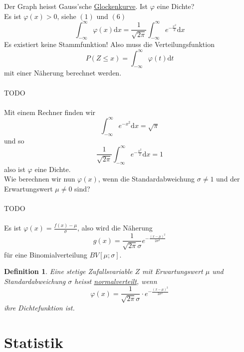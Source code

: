 \documentclass{report}
\newtheorem{mydef}{Definition}
\begin{document}
Der Graph heisst Gauss\rq{}sche \underline{Glockenkurve}. Ist $\varphi$ eine Dichte?\\
Es ist $\varphi(x) > 0$, siehe $(1)$ und $(6)$
\begin{equation}
\int_{- \infty}^{\infty} \varphi(x) \mathrm{d}x = \frac{1}{\sqrt{2 \pi}} \int_{- \infty}^{\infty} e^{-\frac{x^2}{2}} \mathrm{d}x
\end{equation}
Es existiert keine Stammfunktion! Also muss die Verteilungsfunktion
\begin{equation}
P(Z \leq x) = \int_{-\infty}^{\infty} \varphi(t) \mathrm{d}t
\end{equation}
mit einer Näherung berechnet werden.
\\\\TODO\\\\
Mit einem Rechner finden wir
\begin{equation}
\int_{- \infty}^{\infty} e^{-x^2} \mathrm{d}x = \sqrt{\pi}
\end{equation}
und so
\begin{equation}
\frac{1}{\sqrt{2 \pi}} \int_{-\infty}^{\infty} e^{-\frac{x^2}{2}} \mathrm{d}x = 1
\end{equation}
also ist $\varphi$ eine Dichte.\\
Wie berechnen wir nun $\varphi(x)$, wenn die Standardabweichung $\sigma \neq 1$ und der Erwartungswert $\mu \neq 0$ sind?
\\\\TODO\\\\
Es ist $\varphi(x) = \frac{f(x) - \mu}{\sigma}$, also wird die Näherung
\begin{equation}
g(x) = \frac{1}{\sqrt{2 \pi} \sigma} e^{-\frac{(x-\mu)^2}{2 \sigma^2}}
\end{equation}
für eine Binomialverteilung $BV[\mu; \sigma]$.
\begin{mydef}
Eine stetige Zufallsvariable $Z$ mit Erwartungswert $\mu$ und Standardabweichung $\sigma$ heisst \underline{normalverteilt}, wenn
\begin{equation}
\varphi(x) = \frac{1}{\sqrt{2 \pi} \sigma} \cdot e^{-\frac{(x-\mu)^2}{2 \sigma^2}}
\end{equation}
ihre Dichtefunktion ist.
\end{mydef}

\chapter{Statistik}
\end{document}
